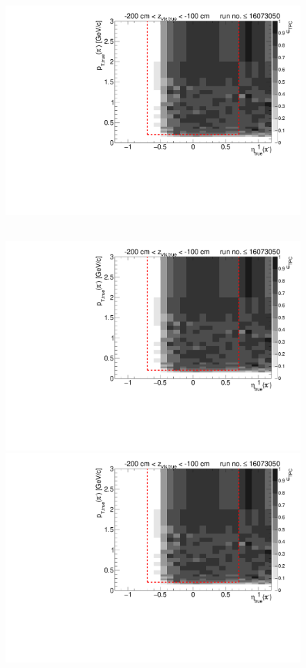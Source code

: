 \begin{figure}[hb]
{  \includegraphics[width=\linewidth,page=17]{graphics/eff/Eff2D_TPC_pion_Minus_RunRange1.pdf}
}~
\parbox{0.495\textwidth}{
  \centering
  \includegraphics[width=\linewidth,page=12]{graphics/eff/Eff2D_TPC_pion_Minus_RunRange1.pdf}\\
  \includegraphics[width=\linewidth,page=14]{graphics/eff/Eff2D_TPC_pion_Minus_RunRange1.pdf}\\
}
\end{figure}
